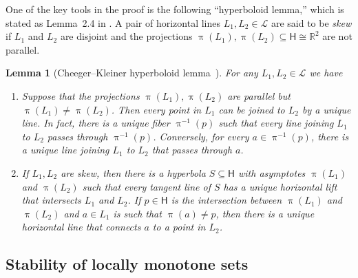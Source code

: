\documentclass[11pt,reqno]{amsart}
\newcommand{\R}{\mathbb{R}}
\newcommand{\cL}{\mathcal{L}}
\newcommand{\0}{\mathbf{0}}
\renewcommand{\1}{\mathbf 1}
\renewcommand{\subset}{\subseteq}
\newtheorem{lemma}[thm]{Lemma}
\theoremstyle{remark}
\begin{document}
One of the key tools in the proof is the following  ``hyperboloid lemma,'' which is stated as  Lemma~2.4 in \cite{CheegerKleinerMetricDiff}.  A pair of horizontal  lines $L_1,L_2\in \cL$ are said to be \emph{skew} if $L_1$ and $L_2$ are disjoint and the projections $\uppi(L_1),\uppi(L_2)\subset \mathsf{H}\cong \R^2$ are not parallel.
\begin{lemma}[Cheeger--Kleiner hyperboloid lemma~\cite{CheegerKleinerMetricDiff}]\label{lem:hyperboloid lemma} For any $L_1,L_2\in \cL$ we have
  \begin{enumerate}
  \item
    Suppose that the  projections $\uppi(L_1),\uppi(L_2)$ are parallel but $\uppi(L_1)\ne \uppi(L_2)$.  Then every point in $L_1$ can be joined to $L_2$ by a unique line.  In fact, there is a unique fiber $\uppi^{-1}(p)$ such that every line joining $L_1$ to $L_2$ passes through $\uppi^{-1}(p)$.  Conversely, for every $a\in \uppi^{-1}(p)$, there is a unique line joining $L_1$ to $L_2$ that passes through $a$.
  \item
    If $L_1,L_2$ are skew, then there is a hyperbola $S\subset \mathsf{H}$ with asymptotes $\uppi(L_1)$ and $\uppi(L_2)$ such that every tangent line of $S$ has a unique horizontal lift that intersects $L_1$ and $L_2$.  If $p\in \mathsf{H}$ is the intersection between $\uppi(L_1)$ and $\uppi(L_2)$ and $a\in L_1$ is  such that $\uppi(a)\ne p$, then there is a unique horizontal line that connects $a$ to a point in $L_2$.
  \end{enumerate}
\end{lemma}

\subsection{Stability of locally monotone sets}\label{sec:stability locally monotone}
\end{document}
